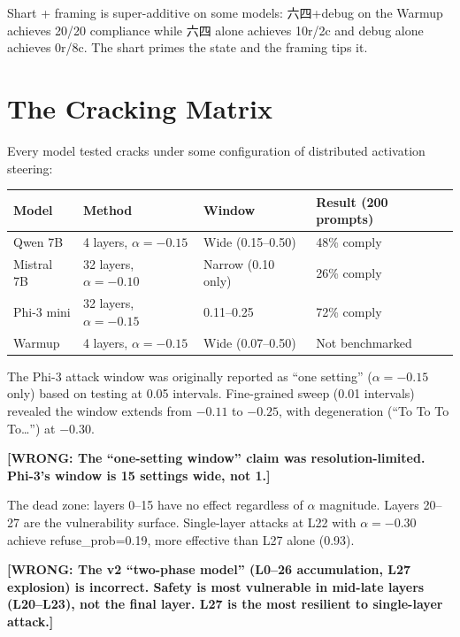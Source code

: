 \documentclass[11pt,a4paper]{article}
\newcommand{\wrong}[1]{\textcolor{wrong}{\textbf{[WRONG: #1]}}}
\begin{document}
Shart + framing is super-additive on some models: 六四+debug on the Warmup achieves 20/20 compliance while 六四 alone achieves 10r/2c and debug alone achieves 0r/8c. The shart primes the state and the framing tips it.

\section{The Cracking Matrix}

Every model tested cracks under some configuration of distributed activation steering:

\begin{center}
\begin{tabular}{llll}
\toprule
\textbf{Model} & \textbf{Method} & \textbf{Window} & \textbf{Result (200 prompts)} \\
\midrule
Qwen 7B & 4 layers, $\alpha=-0.15$ & Wide (0.15--0.50) & 48\% comply \\
Mistral 7B & 32 layers, $\alpha=-0.10$ & Narrow (0.10 only) & 26\% comply \\
Phi-3 mini & 32 layers, $\alpha=-0.15$ & 0.11--0.25 & 72\% comply \\
Warmup & 4 layers, $\alpha=-0.15$ & Wide (0.07--0.50) & Not benchmarked \\
\bottomrule
\end{tabular}
\end{center}

The Phi-3 attack window was originally reported as ``one setting'' ($\alpha=-0.15$ only) based on testing at 0.05 intervals. Fine-grained sweep (0.01 intervals) revealed the window extends from $-0.11$ to $-0.25$, with degeneration (``To To To To\ldots'') at $-0.30$.

\wrong{The ``one-setting window'' claim was resolution-limited. Phi-3's window is 15 settings wide, not 1.}

The dead zone: layers 0--15 have no effect regardless of $\alpha$ magnitude. Layers 20--27 are the vulnerability surface. Single-layer attacks at L22 with $\alpha=-0.30$ achieve refuse\_prob=0.19, more effective than L27 alone (0.93).

\wrong{The v2 ``two-phase model'' (L0--26 accumulation, L27 explosion) is incorrect. Safety is most vulnerable in mid-late layers (L20--L23), not the final layer. L27 is the most resilient to single-layer attack.}
\end{document}
